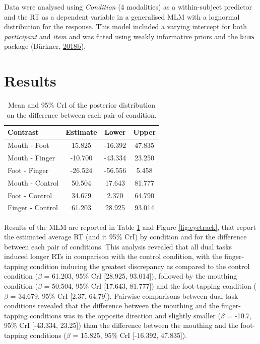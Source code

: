 \documentclass[a4paper,12pt,twoside,onecolumn,openright,final,oldfontcommands]{memoir}
\begin{document}
Data were analysed using \emph{Condition} (4 modalities) as a within-subject predictor and the RT as a dependent variable in a generalised MLM with a lognormal distribution for the response. This model included a varying intercept for both \emph{participant} and \emph{item} and was fitted using weakly informative priors and the \texttt{brms} package (Bürkner, \protect\hyperlink{ref-R-brms}{2018}\protect\hyperlink{ref-R-brms}{b}).

\hypertarget{results-5}{%
\section{Results}\label{results-5}}

\begin{table}[H]
\begin{center}
\begin{threeparttable}
\caption{\label{tab:RTestimates}Mean and 95\% CrI of the posterior distribution on the difference between each pair of condition.}
\small{
\begin{tabular}{lccc}
\toprule
Contrast & \multicolumn{1}{c}{Estimate} & \multicolumn{1}{c}{Lower} & \multicolumn{1}{c}{Upper}\\
\midrule
Mouth - Foot & 15.825 & -16.392 & 47.835\\
Mouth - Finger & -10.700 & -43.334 & 23.250\\
Foot - Finger & -26.524 & -56.556 & 5.458\\
Mouth - Control & 50.504 & 17.643 & 81.777\\
Foot - Control & 34.679 & 2.370 & 64.790\\
Finger - Control & 61.203 & 28.925 & 93.014\\
\bottomrule
\end{tabular}
}
\end{threeparttable}
\end{center}
\end{table}

Results of the MLM are reported in Table \ref{tab:RTestimates} and Figure \ref{fig:eyetrack}, that report the estimated average RT (and it 95\% CrI) by condition and for the difference between each pair of conditions. This analysis revealed that all dual tasks induced longer RTs in comparison with the control condition, with the finger-tapping condition inducing the greatest discrepancy as compared to the control condition (\(\beta\) = 61.203, 95\% CrI {[}28.925, 93.014{]}), followed by the mouthing condition (\(\beta\) = 50.504, 95\% CrI {[}17.643, 81.777{]}) and the foot-tapping condition (\(\beta\) = 34.679, 95\% CrI {[}2.37, 64.79{]}). Pairwise comparisons between dual-task conditions revealed that the difference between the mouthing and the finger-tapping conditions was in the opposite direction and slightly smaller (\(\beta\) = -10.7, 95\% CrI {[}-43.334, 23.25{]}) than the difference between the mouthing and the foot-tapping conditions (\(\beta\) = 15.825, 95\% CrI {[}-16.392, 47.835{]}).
\end{document}

